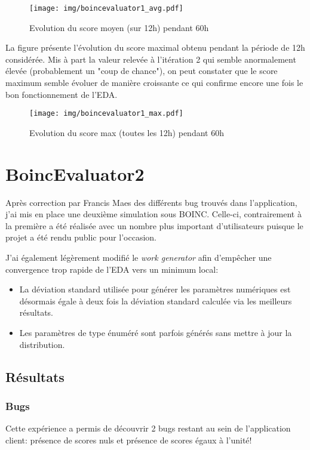 \documentclass[a4paper, 11pt]{report}
\begin{document}
\begin{figure}[!h]
\centering
\texttt{[image: img/boincevaluator1\_avg.pdf]}
\caption{Evolution du score moyen (sur 12h) pendant 60h}%
\label{boincevaluator1_avg}
\end{figure}

La figure %
présente l'évolution du score maximal obtenu pendant la période de 12h considérée. Mis à part la valeur relevée à l'itération 2 %
qui semble anormalement élevée (probablement un "coup de chance"), on peut constater que le score maximum semble évoluer de manière croissante ce qui confirme encore une fois le bon fonctionnement de l'EDA.
\begin{figure}[!h]
\centering
\texttt{[image: img/boincevaluator1\_max.pdf]}
\caption{Evolution du score max (toutes les 12h) pendant 60h}%
\label{boincevaluator1_avg}
\end{figure}




\section{BoincEvaluator2}
Après correction par Francis Maes des différents bug trouvés dans l'application, j'ai mis en place une deuxième simulation sous \textsc{BOINC}. Celle-ci, contrairement à la première a été réalisée avec un nombre plus important d'utilisateurs puisque le projet a été rendu public pour l'occasion.

J'ai également légèrement modifié le \textit{work generator} afin d'empêcher une convergence trop rapide de l'EDA vers un minimum local:
\begin{itemize}
\item La déviation standard utilisée pour générer les paramètres numériques est désormais égale à deux fois la déviation standard calculée via les meilleurs résultats.
\item Les paramètres de type énuméré sont parfois générés sans mettre à jour la distribution. %
\end{itemize}

\subsection{Résultats}

\subsubsection{Bugs}
Cette expérience a permis de découvrir 2 bugs restant au sein de l'application client: présence de scores nuls et présence de scores égaux à l'unité!
\end{document}
